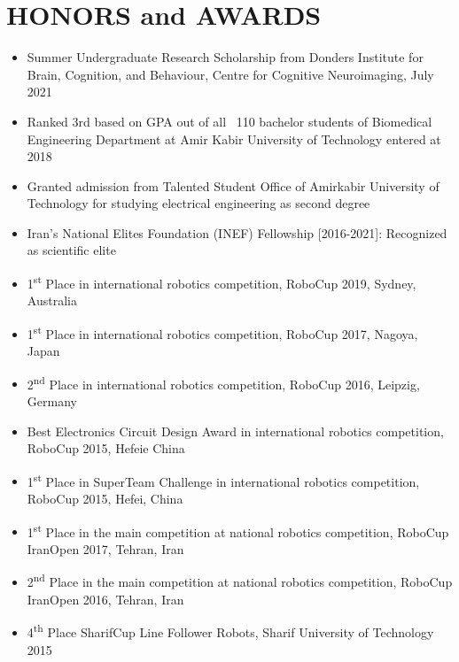 \documentclass[10pt,a4paper,sans]{moderncv} %
\begin{document}
	\section{HONORS and AWARDS}
    \vspace{0.3em}
	\begin{itemize}
        \item Summer Undergraduate Research Scholarship from Donders Institute for Brain, Cognition, and Behaviour, Centre for Cognitive Neuroimaging, July 2021
        \item Ranked 3rd based on GPA out of all ~110 bachelor students of Biomedical Engineering Department at Amir Kabir University of Technology entered at 2018
		\item Granted admission from Talented Student Office of Amirkabir University of Technology for studying electrical engineering as second degree
        \item Iran’s National Elites Foundation (INEF) Fellowship [2016-2021]: Recognized as scientific elite
        \item 1\textsuperscript{st} Place in international robotics competition, RoboCup 2019, Sydney, Australia
        \item 1\textsuperscript{st} Place in international robotics competition, RoboCup 2017, Nagoya, Japan
        \item 2\textsuperscript{nd} Place in international robotics competition, RoboCup 2016, Leipzig, Germany
        \item Best Electronics Circuit Design Award in international robotics competition, RoboCup 2015, Hefeie China
        \item 1\textsuperscript{st} Place in SuperTeam Challenge in international robotics competition, RoboCup 2015, Hefei, China
        \item 1\textsuperscript{st} Place in the main competition at national robotics competition, RoboCup IranOpen 2017, Tehran, Iran
        \item 2\textsuperscript{nd} Place in the main competition at national robotics competition, RoboCup IranOpen 2016, Tehran, Iran
        \item 4\textsuperscript{th} Place SharifCup Line Follower Robots, Sharif University of Technology 2015
	\end{itemize}
	
\end{document}
